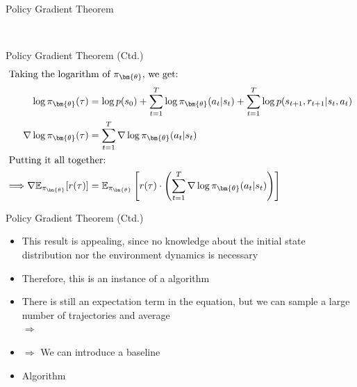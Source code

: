\begin{frame}{Policy Gradient Theorem}{}
	\begin{boxBlue}
		 \\[2mm]
		\footnotesize
	\end{boxBlue}
\end{frame}


\begin{frame}{Policy Gradient Theorem (Ctd.)}{}
	\vspace*{-7mm}
	\begin{align*}
		\intertext{Taking the logarithm of $\pi_{\bm{\theta}}$, we get:}
		\log\pi_{\bm{\theta}}(\tau)
			&= \log p(s_0) + \sum_{t=1}^T \log \pi_{\bm{\theta}}(a_t \vert s_t) + \sum_{t=1}^T \log p(s_{t+1}, r_{t+1} \vert s_t, a_t) \\
		\nabla\log\pi_{\bm{\theta}}(\tau)
			&= \sum_{t=1}^T \nabla\log\pi_{\bm{\theta}}(a_t \vert s_t) \\
		\intertext{Putting it all together:}
		\Longrightarrow \nabla\mathbb{E}_{\pi_{\bm{\theta}}}[r(\tau)]
			&= \mathbb{E}_{\pi_{\bm{\theta}}}\left[ r(\tau) \cdot \left( \sum_{t=1}^T \nabla\log\pi_{\bm{\theta}}(a_t \vert s_t) \right) \right]
	\end{align*}
\end{frame}


\begin{frame}{Policy Gradient Theorem (Ctd.)}{}
	\begin{itemize}
		\item This result is appealing, since no knowledge about the initial state distribution nor the environment dynamics is necessary
		\item Therefore, this is an instance of a  algorithm
		\item There is still an expectation term in the equation, but we can sample a large number of trajectories and average \\
			$\Rightarrow$ 
		\item {}
			$\Rightarrow$ We can introduce a baseline
		\item Algorithm 
	\end{itemize}
\end{frame}


